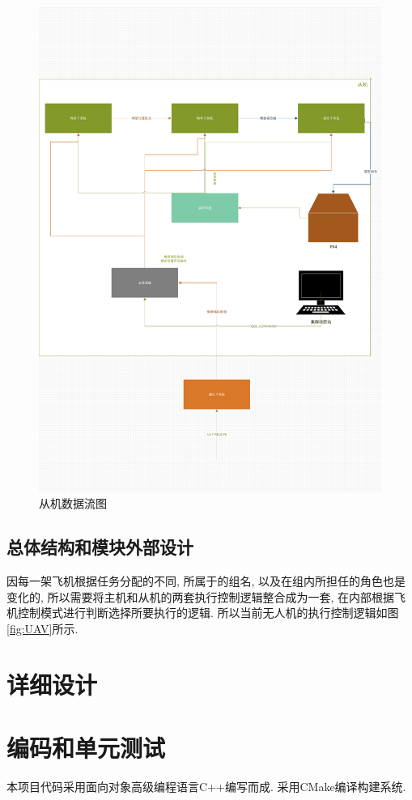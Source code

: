         \begin{figure}
          \centering
          \includegraphics[width=\textwidth]{pictures/follower.pdf}
          \caption{从机数据流图}
          \label{fig:follower}
        \end{figure}

        \subsection{总体结构和模块外部设计}
        因每一架飞机根据任务分配的不同, 所属于的组名, 以及在组内所担任的角色也是变化的, 所以需要将主机和从机的两套执行控制逻辑整合成为一套, 在内部根据飞机控制模式进行判断选择所要执行的逻辑. 所以当前无人机的执行控制逻辑如图\ref{fig:UAV}所示. 
        
        
        \clearpage
    \section{详细设计}
      
        \clearpage
    \section{编码和单元测试}
      本项目代码采用面向对象高级编程语言C++编写而成. 采用CMake编译构建系统. 